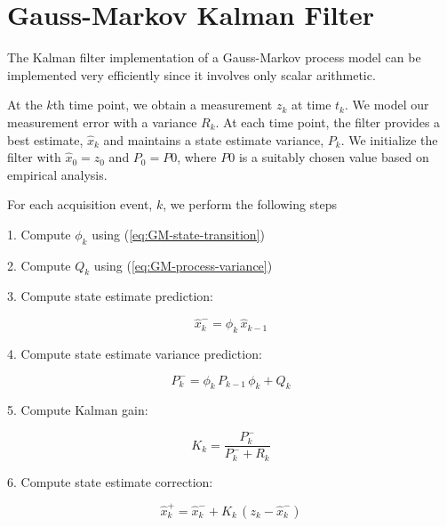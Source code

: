 \documentclass[12pt]{article}
\begin{document}
%
%

\clearpage
\section{Gauss-Markov Kalman Filter}

The Kalman filter implementation of a Gauss-Markov process model can be implemented
very efficiently since it involves only scalar arithmetic.

At the $k$th time point, we obtain a measurement $z_k$ at time $t_k$. We model our
measurement error with a variance $R_k$. At each time point, the filter provides a best
estimate, $\hat{x}_k$ and maintains a state estimate variance, $P_k$. We initialize the
filter with $\hat{x}_0 = z_0$ and $P_0 = P0$, where $P0$ is a suitably chosen value based
on empirical analysis.

For each acquisition event, $k$, we perform the following steps

1. Compute $\phi_k$ using (\ref{eq:GM-state-transition})

2. Compute $Q_k$ using (\ref{eq:GM-process-variance})

3. Compute state estimate prediction:

\begin{equation}
    \hat{x}_k^- = \phi_k \, \hat{x}_{k-1}
    \label{eq:GM-KF-x-prediction}
\end{equation}

4. Compute state estimate variance prediction:

\begin{equation}
    P_k^- = \phi_k \, P_{k-1} \, \phi_k + Q_k
    \label{eq:GM-KF-P-prediction}
\end{equation}

5. Compute Kalman gain:

\begin{equation}
    K_k = \frac{P_k^-}{P_k^- + R_k}
    \label{eq:GM-KF-gain}
\end{equation}

6. Compute state estimate correction:

\begin{equation}
    \hat{x}_k^+ = \hat{x}_k^- + K_k \,(z_k - \hat{x}_k^-)
    \label{eq:GM-KF-x-correction}
\end{equation}
\end{document}
